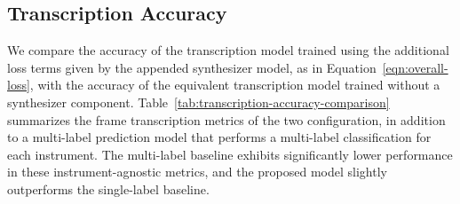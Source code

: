 \subsection{Transcription Accuracy}

We compare the accuracy of the transcription model trained using the additional loss terms given by the appended synthesizer model, as in Equation~\ref{eqn:overall-loss}, with the accuracy of the equivalent transcription model trained without a synthesizer component.
Table~\ref{tab:transcription-accuracy-comparison} summarizes the frame transcription metrics of the two configuration, in addition to a multi-label prediction model that performs a multi-label classification for each instrument.
The multi-label baseline exhibits significantly lower performance in these instrument-agnostic metrics, and the proposed model slightly outperforms the single-label baseline.

